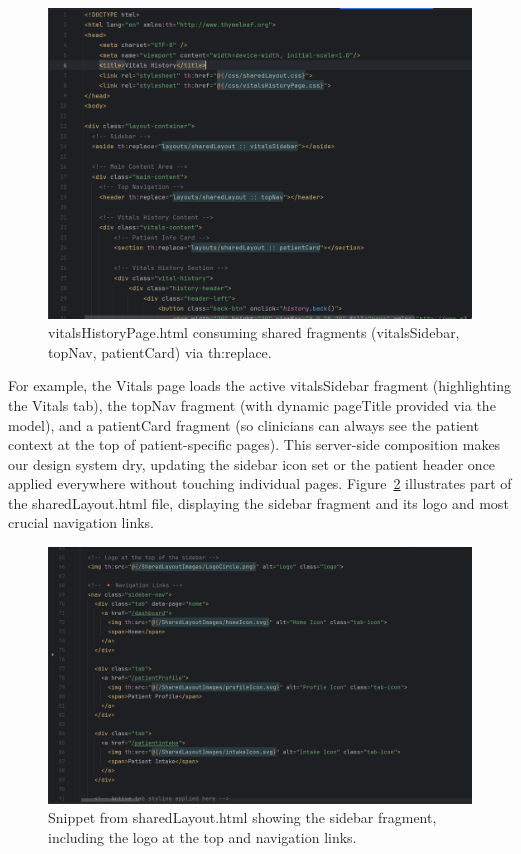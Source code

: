 \begin{figure}[H]
  \centering
  \includegraphics[width=0.8\linewidth]{images03/3-2-2-vitalHS.png}
  \caption{vitalsHistoryPage.html consuming shared fragments (vitalsSidebar, topNav, patientCard) via th:replace.}
  \label{fig:3-2-2-vital-history-page}
\end{figure}

For example, the Vitals page loads the active vitalsSidebar fragment (highlighting the Vitals tab), the topNav fragment (with dynamic pageTitle provided via the model), and a patientCard fragment (so clinicians can always see the patient context at the top of patient-specific pages). This server-side composition makes our design system dry, updating the sidebar icon set or the patient header once applied everywhere without touching individual pages. Figure~\ref{fig:3-2-2-sharedLayout} illustrates part of the sharedLayout.html file, displaying the sidebar fragment and its logo and most crucial navigation links.

\begin{figure}[H]
  \centering
  \includegraphics[width=0.8\linewidth]{images03/3-2-2-sharedLayout.png}
  \caption{Snippet from sharedLayout.html showing the sidebar fragment, including the logo at the top and navigation links.}
  \label{fig:3-2-2-sharedLayout}
\end{figure}

